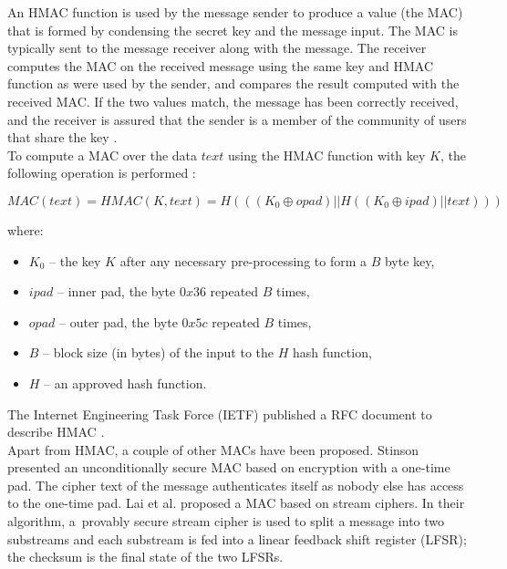 An HMAC function is used by the message sender to produce a value (the MAC)
that is formed by condensing the secret key and the message input. The MAC is
typically sent to the message receiver along with the message. The receiver
computes the MAC on the received message using the same key and HMAC function
as were used by the sender, and compares the result computed with the received
MAC. If the two values match, the message has been correctly received, and the
receiver is assured that the sender is a member of the community of users that
share the key \cite{nist-hmac}.\\

To compute a MAC over the data $text$ using the HMAC function with key $K$, the
following operation is performed \cite{nist-hmac}:

\begin{equation}
	MAC(text) = HMAC(K, text) = H(((K_{0} \oplus opad)||H((K_{0} \oplus ipad) || text)))
\end{equation}

where:

\begin{itemize}
	\item \textbf{$K_{0}$} -- the key $K$ after any necessary pre-processing to
	form a $B$ byte key,
	\item \textbf{$ipad$} -- inner pad, the byte $0x36$ repeated $B$ times,
	\item \textbf{$opad$} -- outer pad, the byte $0x5c$ repeated $B$ times,
	\item \textbf{$B$} -- block size (in bytes) of the input to the $H$ hash function,
	\item \textbf{$H$} -- an approved hash function.
\end{itemize}

The Internet Engineering Task Force (IETF) published a RFC document to describe
HMAC \cite{rfc2104}.\\

Apart from HMAC, a couple of other MACs have been proposed. Stinson
\cite{unconditional-mac} presented an unconditionally secure MAC based on 
encryption with a one-time pad. The cipher text of the message authenticates
itself as nobody else has access to the one-time pad. Lai et al.
\cite{stream-mac} proposed a MAC based on stream ciphers. In their algorithm,
a~provably secure stream cipher is used to split a message into two substreams
and each substream is fed into a linear feedback shift register (LFSR); the
checksum is the final state of the two LFSRs.\\

